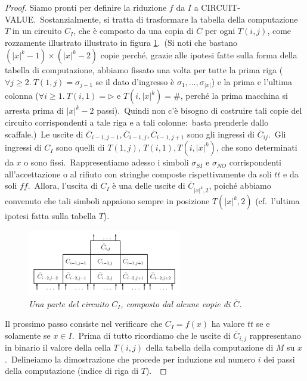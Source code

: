 \begin{proof}
    \noindent Siamo pronti per definire la riduzione $f$ da $I$ a {\footnotesize CIRCUIT-VALUE}.\
    Sostanzialmente, si tratta di trasformare la tabella della computazione $T$ in un circuito $C_I$, che è composto da una copia di $\overline{C}$ per ogni $T(i, j)$, come rozzamente illustrato illustrato in figura \ref{fig:circ-dim2}.\
    (Si noti che bastano $\left(|x|^k -1\right) \times \left(|x|^k-2\right)$ copie perché, grazie alle ipotesi fatte sulla forma della tabella di computazione, abbiamo fissato una volta per tutte la prima riga ($\forall j \geq 2.\ T(1,j) = \sigma_{j-1}$ se il dato d'ingresso è $\sigma_1, \dots, \sigma_{|x|}$) e la prima e l'ultima colonna ($\forall i \geq 1.\ T(i,1) = \triangleright$ e $T\left(i, |x|^k\right) = \#$, perché la prima macchina si arresta prima di $|x|^k -2$ passi).\ Quindi non c'è bisogno di costruire tali copie del circuito corrispondenti a tale riga e a tali colonne:\ basta prenderle dallo scaffale.)\
    Le uscite di $\overline{C}_{i-1, j-1},\overline{C}_{i-1, j},\overline{C}_{i-1, j+1}$ sono gli ingressi di $\overline{C}_{ij}$.\
    Gli ingressi di $C_I$ sono quelli di $T(1,j)$, $T(i,1), T\left(i, |x|^k\right)$, che sono determinati da $x$ o sono fissi.\
    Rappresentiamo adesso i simboli $\sigma_{SI}$ e $\sigma_{NO}$ corrispondenti all'accettazione o al rifiuto con stringhe composte rispettivamente da soli $\mathit{tt}$ e da soli $\mathit{ff}$.\
    Allora, l'uscita di $C_I$ è una delle uscite di $\overline{C}_{|x|^k, 2}$, poiché abbiamo convenuto che tali simboli appaiono sempre in posizione $T\left(|x|^k,2\right)$ (cf.\ l'ultima ipotesi fatta sulla tabella $T$).\

    \begin{figure}[H]
        \centering
        \includegraphics[width=0.6\textwidth]{images/circuitValue2.PNG}
        \caption{\textit{Una parte del circuito $C_I$, composto dal alcune copie di $\overline{C}$.}}
        \label{fig:circ-dim2}
    \end{figure}

    \noindent Il prossimo passo consiste nel verificare che $C_I = f(x)$ ha valore $\mathit{tt}$ se e solamente se $x \in I$.\
    Prima di tutto ricordiamo che le uscite di $\overline{C}_{i,j}$ rappresentano in binario il valore della cella $T(i, j)$ della tabella della computazione di $M$ su $x$.\ Delineiamo la dimostrazione che procede per induzione sul numero $i$ dei passi della computazione (indice di riga di $T$).\


\end{proof}
